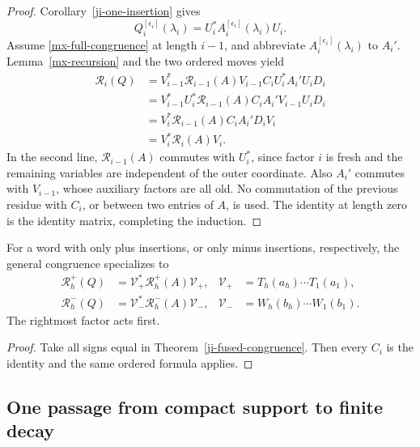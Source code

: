 \begin{proof}
Corollary~\ref{ji-one-insertion} gives
\[
       Q_i^{[\epsilon_i]}(\lambda_i)
            =U_i^*A_i^{[\epsilon_i]}(\lambda_i)U_i.
\]
Assume \eqref{mx-full-congruence} at length \(i-1\), and
abbreviate \(A_i^{[\epsilon_i]}(\lambda_i)\) to \(A_i'\).
Lemma~\ref{mx-recursion} and the two ordered moves yield
\[
\begin{split}
 \mathcal R_i(Q)
 &=V_{i-1}^*\mathcal R_{i-1}(A)V_{i-1}
                              C_iU_i^*A_i'U_iD_i\\
 &=V_{i-1}^*U_i^*\mathcal R_{i-1}(A)C_i
                                      A_i'V_{i-1}U_iD_i\\
 &=V_i^*\mathcal R_{i-1}(A)C_iA_i'D_iV_i\\
 &=V_i^*\mathcal R_i(A)V_i.
\end{split}
\]
In the second line, \(\mathcal R_{i-1}(A)\) commutes with
\(U_i^*\), since factor \(i\) is fresh and the remaining
variables are independent of the outer coordinate.  Also
\(A_i'\) commutes with \(V_{i-1}\), whose auxiliary factors
are all old.  No commutation of the previous residue with
\(C_i\), or between two entries of \(A\), is used.
The identity at length zero is the identity matrix, completing
the induction.
\end{proof}


\begin{corollary}\label{ji-single-sign-congruence}
For a word with only plus insertions, or only minus insertions,
respectively, the general congruence specializes to
\begin{align}
 \mathcal R_h^+(Q)
   &=\mathcal V_+^*\mathcal R_h^+(A)\mathcal V_+,
 &\mathcal V_+&=T_h(a_h)\cdots T_1(a_1),
                                      \label{ji-plus-congruence}\\
 \mathcal R_h^-(Q)
   &=\mathcal V_-^*\mathcal R_h^-(A)\mathcal V_-,
 &\mathcal V_-&=W_h(b_h)\cdots W_1(b_1).
                                      \label{ji-minus-congruence}
\end{align}
The rightmost factor acts first.
\end{corollary}

\begin{proof}
Take all signs equal in Theorem~\ref{ji-fused-congruence}.
Then every \(C_i\) is the identity and the same ordered formula
applies.
\end{proof}

\subsection{One passage from compact support to finite decay}

